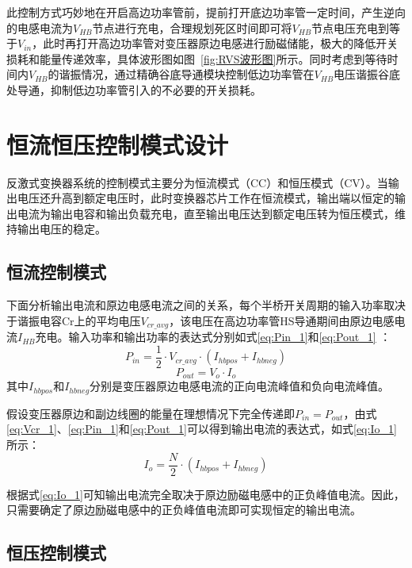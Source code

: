此控制方式巧妙地在开启高边功率管前，提前打开底边功率管一定时间，产生逆向的电感电流为$V_{HB}$节点进行充电，合理规划死区时间即可将$V_{HB}$节点电压充电到等于$V_{in}$，此时再打开高边功率管对变压器原边电感进行励磁储能，极大的降低开关损耗和能量传递效率，具体波形图如图~\ref{fig:RVS波形图}所示。同时考虑到等待时间内$V_{HB}$的谐振情况，通过精确谷底导通模块控制低边功率管在$V_{HB}$电压谐振谷底处导通，抑制低边功率管引入的不必要的开关损耗。

\section{恒流恒压控制模式设计}
反激式变换器系统的控制模式主要分为恒流模式（CC）和恒压模式（CV）。当输出电压还升高到额定电压时，此时变换器芯片工作在恒流模式，输出端以恒定的输出电流为输出电容和输出负载充电，直至输出电压达到额定电压转为恒压模式，维持输出电压的稳定。
\subsection{恒流控制模式}

下面分析输出电流和原边电感电流之间的关系，每个半桥开关周期的输入功率取决于谐振电容Cr上的平均电压$V_{cr\_avg}$，该电压在高边功率管HS导通期间由原边电感电流$I_{HB}$充电。输入功率和输出功率的表达式分别如式\eqref{eq:Pin_1}和\eqref{eq:Pout_1} ：
\begin{equation}
    \label{eq:Pin_1}
    P_{in}=\frac{1}{2} \cdot V_{cr\_avg} \cdot (I_{hbpos}+I_{hbneg})
\end{equation}
\begin{equation}
    \label{eq:Pout_1}
    P_{out}=V_o \cdot I_o
\end{equation}
其中$I_{hbpos}$和$I_{hbneg}$分别是变压器原边电感电流的正向电流峰值和负向电流峰值。

假设变压器原边和副边线圈的能量在理想情况下完全传递即$P_{in}=P_{out}$，由式\eqref{eq:Vcr_1}、\eqref{eq:Pin_1}和\eqref{eq:Pout_1}可以得到输出电流的表达式，如式\eqref{eq:Io_1}所示：
\begin{equation}
    \label{eq:Io_1}
    I_o=\frac{N}{2}\cdot(I_{hbpos} + I_{hbneg})
\end{equation}

根据式\eqref{eq:Io_1}可知输出电流完全取决于原边励磁电感中的正负峰值电流。因此，只需要确定了原边励磁电感中的正负峰值电流即可实现恒定的输出电流。

\subsection{恒压控制模式}

